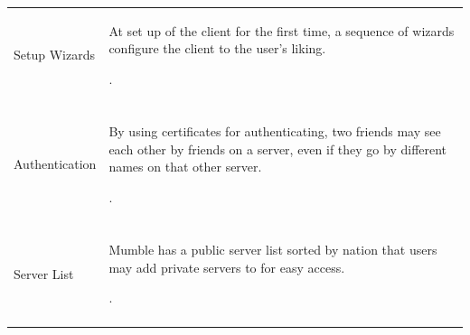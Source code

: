 \documentclass[twoside, titlepage]{article}
\begin{document}
\begin{tabular}[t]{ll}
		\rowcolor{gray}
		Setup Wizards & \begin{minipage}{0.5\textwidth}
			At set up of the client for the first time, a
			sequence of wizards configure the client to
			the user's liking.
		\end{minipage}. \\\\
		Authentication & \begin{minipage}{0.5\textwidth}
			By using certificates for authenticating, two
			friends may see each other by friends on a server,
			even if they go by different names on that other 
			server.
		\end{minipage}. \\\\
		\rowcolor{gray}
		Server List & \begin{minipage}{0.5\textwidth}
			Mumble has a public server list sorted by nation
			that users may add private servers to for easy 
			access.
		\end{minipage}. \\\\
	\end{tabular}
	\newpage
\end{document}
